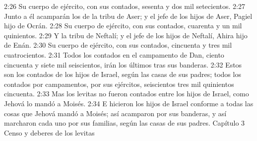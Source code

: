 2:26 Su cuerpo de ejército, con sus contados, sesenta y dos mil setecientos.  
2:27 Junto a él acamparán los de la tribu de Aser; y el jefe de los hijos de Aser, Pagiel hijo de Ocrán.  
2:28 Su cuerpo de ejército, con sus contados, cuarenta y un mil quinientos.  
2:29 Y la tribu de Neftalí; y el jefe de los hijos de Neftalí, Ahira hijo de Enán.  
2:30 Su cuerpo de ejército, con sus contados, cincuenta y tres mil cuatrocientos.  
2:31 Todos los contados en el campamento de Dan, ciento cincuenta y siete mil seiscientos, irán los últimos tras sus banderas.  
2:32 Estos son los contados de los hijos de Israel, según las casas de sus padres; todos los contados por campamentos, por sus ejércitos, seiscientos tres mil quinientos cincuenta.  
2:33 Mas los levitas no fueron contados entre los hijos de Israel, como Jehová lo mandó a Moisés.  
2:34 E hicieron los hijos de Israel conforme a todas las cosas que Jehová mandó a Moisés; así acamparon por sus banderas, y así marcharon cada uno por sus familias, según las casas de sus padres.  
Capítulo 3
Censo y deberes de los levitas  

